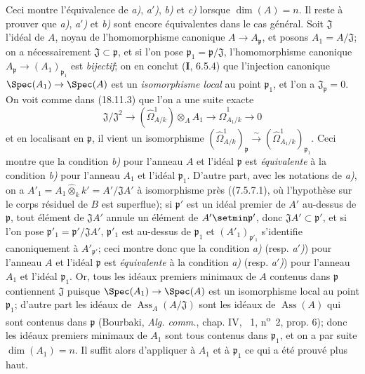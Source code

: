Ceci montre l'équivalence de \emph{a)}, \emph{a$'$)}, \emph{b)} et \emph{c)} lorsque $\dim(A)=n$. Il reste à prouver que \emph{a)}, \emph{a$'$)} et \emph{b)} sont encore équivalentes dans le cas général. Soit $\mathfrak J$ l'idéal de $A$, noyau de l'homomorphisme canonique $A\to A_{\mathfrak p}$, et posons $A_1=A/\mathfrak J$; on a nécessairement $\mathfrak J\subset\mathfrak p$, et si l'on pose $\mathfrak p_1=\mathfrak p/\mathfrak J$, l'homomorphisme canonique $A_{\mathfrak p}\to(A_1)_{\mathfrak p_1}$ est \emph{bijectif}; on en conclut (\textbf{I}, 6.5.4) que l'injection canonique $\Spec(A_1)\to\Spec(A)$ est un \emph{isomorphisme local} au point $\mathfrak p_1$, et l'on a $\mathfrak J_{\mathfrak p}=0$. On voit comme dans (18.11.3) que l'on a une suite exacte
\[
  \mathfrak J/\mathfrak J^2\longrightarrow(\hat{\Omega}^1_{A/k})\otimes_A A_1\longrightarrow\hat{\Omega}^1_{A_1/k}\longrightarrow0
\]
et en localisant en $\mathfrak p$, il vient un isomorphisme
$(\hat{\Omega}^1_{A/k})_{\mathfrak p}\xrightarrow{\sim}(\hat{\Omega}^1_{A_1/k})_{\mathfrak p_1}$.
Ceci montre que la condition \emph{b)} pour l'anneau $A$ et l'idéal $\mathfrak p$ est \emph{équivalente} à la condition \emph{b)} pour l'anneau $A_1$ et l'idéal $\mathfrak p_1$. D'autre part, avec les notations de \emph{a)}, on a $A'_1=A_1\widehat{\otimes}_k k'=A'/\mathfrak JA'$ à isomorphisme près ((7.5.7.1), où l'hypothèse sur le corps résiduel de $B$ est superflue); si $\mathfrak p'$ est un idéal premier de $A'$ au-dessus de $\mathfrak p$, tout élément de $\mathfrak JA'$ annule un élément de $A'\setmin\mathfrak p'$, donc $\mathfrak JA'\subset\mathfrak p'$, et si l'on pose $\mathfrak p'_1=\mathfrak p'/\mathfrak JA'$, $\mathfrak p'_1$ est au-dessus de $\mathfrak p_1$ et $(A'_1)_{\mathfrak p'_1}$ s'identifie canoniquement à $A'_{\mathfrak p'}$; ceci montre donc que la condition \emph{a)} (resp. \emph{a$'$)}) pour l'anneau $A$ et l'idéal $\mathfrak p$ est \emph{équivalente} à la condition \emph{a)} (resp. \emph{a$'$)}) pour l'anneau $A_1$ et l'idéal $\mathfrak p_1$. Or, tous les idéaux premiers minimaux de $A$ contenus dans $\mathfrak p$ contiennent $\mathfrak J$ puisque $\Spec(A_1)\to\Spec(A)$ est un isomorphisme local au point $\mathfrak p_1$; d'autre part les idéaux de $\operatorname{Ass}_A(A/\mathfrak J)$ sont les idéaux de $\operatorname{Ass}(A)$ qui sont contenus dans $\mathfrak p$ (Bourbaki, \emph{Alg. comm.}, chap. IV, \textsection~1, n\textsuperscript{o}~2, prop. 6); donc les idéaux premiers minimaux de $A_1$ sont tous contenus dans $\mathfrak p_1$, et on a par suite $\dim(A_1)=n$. Il suffit alors d'appliquer à $A_1$ et à $\mathfrak p_1$ ce qui a été prouvé plus haut.

